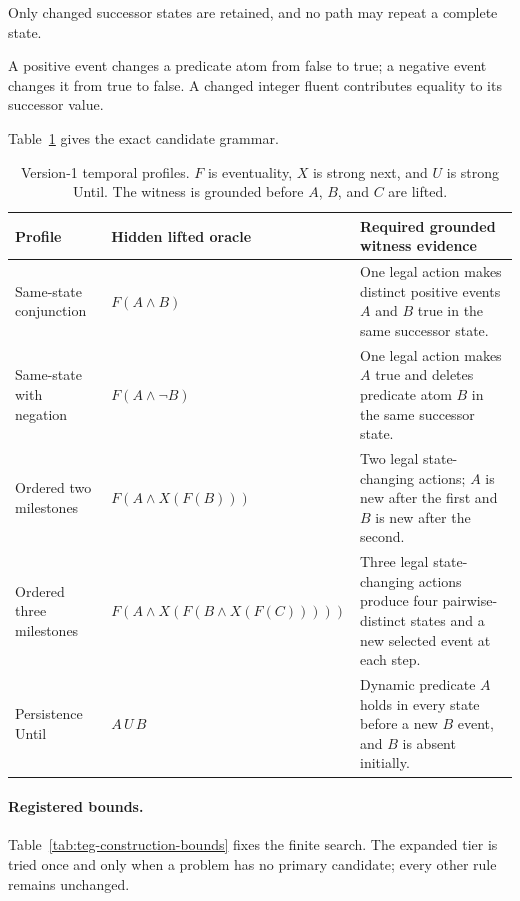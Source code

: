 Only changed successor states are retained, and no path may repeat a complete
state.

A positive event changes a predicate atom from false to true; a negative event
changes it from true to false. A changed integer fluent contributes equality to
its successor value.

Table~\ref{tab:teg-construction-profiles} gives the exact candidate grammar.

\begin{table}[htbp]
\centering
\small
\setlength{\tabcolsep}{4pt}
\begin{tabular}{p{}p{}p{}}
\toprule
Profile & Hidden lifted oracle & Required grounded witness evidence \\
\midrule
Same-state conjunction & $F(A\land B)$ &
One legal action makes distinct positive events $A$ and $B$ true in the same
successor state. \\
Same-state with negation & $F(A\land\neg B)$ &
One legal action makes $A$ true and deletes predicate atom $B$ in the same
successor state. \\
Ordered two milestones & $F(A\land X(F(B)))$ &
Two legal state-changing actions; $A$ is new after the first and $B$ is new
after the second. \\
Ordered three milestones & $F(A\land X(F(B\land X(F(C)))))$ &
Three legal state-changing actions produce four pairwise-distinct states and a
new selected event at each step. \\
Persistence Until & $A\,U\,B$ &
Dynamic predicate $A$ holds in every state before a new $B$ event, and $B$ is
absent initially. \\
\bottomrule
\end{tabular}
\caption{Version-1 temporal profiles. $F$ is eventuality, $X$ is strong next,
and $U$ is strong Until. The witness is grounded before $A$, $B$, and $C$ are
lifted.}
\label{tab:teg-construction-profiles}
\end{table}

\paragraph{Registered bounds.}
Table~\ref{tab:teg-construction-bounds} fixes the finite search. The expanded
tier is tried once and only when a problem has no primary candidate; every
other rule remains unchanged.

